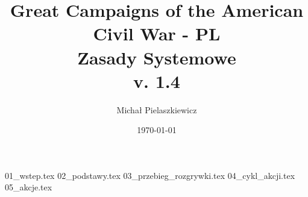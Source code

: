 \documentclass[10pt,twoside,a4paper,table]{article}
\title{Great Campaigns of the American Civil War - PL \\ Zasady Systemowe \\ v. 1.4}
\author{Michał Pielaszkiewicz}
\date{\today}
\newcommand\emptypage{
    \null
    \thispagestyle{empty}
    \addtocounter{page}{-1}
    \newpage
}
\begin{document}
    \maketitle
    \emptypage
    \tableofcontents
    \emptypage
    \begin{multicols*}{2}
        {01_wstep.tex}
        {02_podstawy.tex}
        {03_przebieg_rozgrywki.tex}
        {04_cykl_akcji.tex}
		{05_akcje.tex}
    \end{multicols*}
\end{document}
